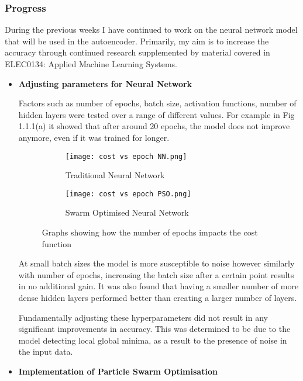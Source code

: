 
\subsubsection{Progress}
During the previous weeks I have continued to work on the neural network model that will be used in the autoencoder. Primarily, my aim is to increase the accuracy through continued research supplemented by material covered in ELEC0134: Applied Machine Learning Systems.
\begin{itemize}
    \item \textbf{Adjusting parameters for Neural Network}
    
    Factors such as number of epochs, batch size, activation functions, number of hidden layers were tested over a range of different values. For example in Fig 1.1.1(a) it showed that after around 20 epochs, the model does not improve anymore, even if it was trained for longer. 
    
    \begin{figure}[H]
        \begin{subfigure}[h]{0.53\linewidth}
        \texttt{[image: cost vs epoch NN.png]}
        \caption{Traditional Neural Network}
        \end{subfigure}
        \hfill
        \begin{subfigure}[h]{0.53\linewidth}
        \texttt{[image: cost vs epoch PSO.png]}
        \caption{Swarm Optimised Neural Network}
        \end{subfigure}%
        \caption{Graphs showing how the number of epochs impacts the cost function}
    \end{figure}
    
    At small batch sizes the model is more susceptible to noise however similarly with number of epochs, increasing the batch size after a certain point results in no additional gain. It was also found that having a smaller number of more dense hidden layers performed better than creating a larger number of layers.
    
    Fundamentally adjusting these hyperparameters did not result in any significant improvements in accuracy. This was determined to be due to the model detecting local global minima, as a result to the presence of noise in the input data.
    
    \item \textbf{Implementation of Particle Swarm Optimisation}
    

\end{itemize}
